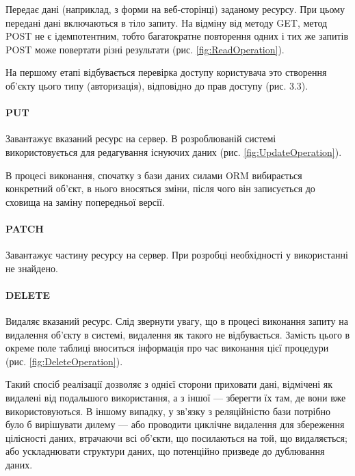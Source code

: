 Передає дані (наприклад, з форми на веб-сторінці) заданому ресурсу. При цьому передані дані включаються в тіло запиту. На відміну від методу GET, метод POST не є ідемпотентним, тобто багатократне повторення одних і тих же запитів POST може повертати різні результати (рис. \ref{fig:ReadOperation}).

На першому етапі відбувається перевірка доступу користувача это створення об’єкту цього типу (авторизація), відповідно до прав доступу (рис. 3.3).

\paragraph{PUT}

Завантажує вказаний ресурс на сервер. В розроблюваній системі використовується для редагування існуючих даних (рис. \ref{fig:UpdateOperation}). 

В процесі виконання, спочатку з бази даних силами ORM вибирається конкретний об’єкт, в нього вносяться зміни, після чого він записується до сховища на заміну попередньої версії.

\paragraph{PATCH}

Завантажує частину ресурсу на сервер. При розробці необхідності у використанні не знайдено.

\paragraph{DELETE}

Видаляє вказаний ресурс.
Слід звернути увагу, що в процесі виконання запиту на видалення об’єкту в системі, видалення як такого не відбувається. Замість цього в окреме поле таблиці вноситься інформація про час виконання цієї процедури (рис. \ref{fig:DeleteOperation}).

Такий спосіб реалізації дозволяє з однієї сторони приховати дані, відмічені як видалені від подальшого використання, а з іншої — зберегти їх там, де вони вже використовуються. В іншому випадку, у зв’язку з реляційністю бази потрібно було б вирішувати дилему — або проводити циклічне видалення для збереження цілісності даних, втрачаючи всі об’єкти, що посилаються на той, що видаляється; або ускладнювати структури даних, що потенційно призведе до дублювання даних.

